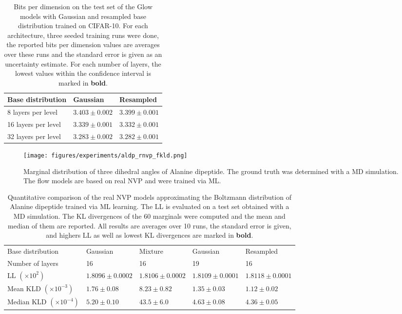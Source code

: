 \documentclass[twoside]{article}
\begin{document}
\begin{table}[h]
  \caption{Bits per dimension on the test set of the Glow models with Gaussian and resampled base distribution trained on CIFAR-10. For each architecture, three seeded training runs were done, the reported bits per dimension values are averages over these runs and the standard error is given as an uncertainty estimate. For each number of layers, the lowest values within the confidence interval is marked in \textbf{bold}.}
  \label{tab:images_bpd}
  \centering
  \vspace{0.3cm}
  \begin{tabular}{l|ll}
    Base distribution & Gaussian & Resampled \\
    \hline
    8 layers per level & $3.403\pm0.002$ & $\mathbf{3.399\pm0.001}$ \\
    16 layers per level & $3.339\pm0.001$ & $\mathbf{3.332\pm0.001}$ \\
    32 layers per level & $\mathbf{3.283\pm0.002}$ & $\mathbf{3.282\pm0.001}$ 
  \end{tabular}
\end{table}

\begin{figure*}[h]
    \centering
    \texttt{[image: figures/experiments/aldp\_rnvp\_fkld.png]}
    \caption{Marginal distribution of three dihedral angles of Alanine dipeptide. The ground truth was determined with a MD simulation. The flow models are based on real NVP and were trained via ML.}
    \label{fig:aldp_rnvp_fkld}
\end{figure*}

\begin{table*}[h]
  \caption{Quantitative comparison of the real NVP models approximating the Boltzmann distribution of Alanine dipeptide trained via ML learning. The LL is evaluated on a test set obtained with a MD simulation. The KL divergences of the 60 marginals were computed and the mean and median of them are reported. All results are averages over 10 runs, the standard error is given, and highers LL as well as lowest KL divergences are marked in \textbf{bold}.}
  \label{tab:aldp_kld_rnvp_fkld}
  \centering
  \vspace{0.3cm}
  \begin{tabular}{l|llll}
    Base distribution & Gaussian & Mixture & Gaussian & Resampled \\
    Number of layers & 16 & 16 & 19 & 16  \\
    \hline
    LL $(\times 10^2)$ & $1.8096\pm0.0002$ & $1.8106\pm0.0002$ & $1.8109\pm0.0001$ & $\mathbf{1.8118\pm0.0001}$ \\
    Mean KLD $(\times 10^{-3})$ & $1.76\pm0.08$ & $8.23\pm0.82$ & $1.35\pm0.03$ & $\mathbf{1.12\pm0.02}$ \\
    Median KLD $(\times 10^{-4})$ & $5.20\pm0.10$ & $43.5\pm6.0$ & $4.63\pm0.08$ & $\mathbf{4.36\pm0.05}$ 
  \end{tabular}
\end{table*}
\end{document}
